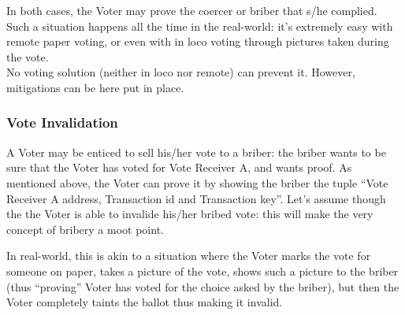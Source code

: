 \documentclass[10pt, letterpaper]{article}
\begin{document}
In both cases, the Voter may prove the coercer or briber that s/he complied. Such a situation happens all the time in the real-world: it’s extremely easy with remote paper voting, or even with in loco voting through pictures taken during the vote.\\
No voting solution (neither in loco nor remote) can prevent it. However, mitigations can be here put in place.
\subsubsection{Vote Invalidation}
A Voter may be enticed to sell his/her vote to a briber: the briber wants to be sure that the Voter has voted for Vote Receiver A, and wants proof. As mentioned above, the Voter can prove it by showing the briber the tuple “Vote Receiver A address, Transaction id and Transaction key”. Let’s assume though the the Voter is able to invalide his/her bribed vote: this will make the very concept of bribery a moot point.
\bigskip

In real-world, this is akin to a situation where the Voter marks the vote for someone on paper, takes a picture of the vote, shows such a picture to the briber (thus “proving” Voter has voted for the choice asked by the briber), but then the Voter completely taints the ballot thus making it invalid.
\end{document}
